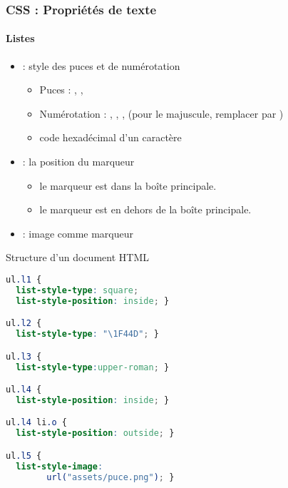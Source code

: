 \documentclass[xcolor=table]{beamer}
\begin{document}
\begin{frame}[fragile]
\frametitle{CSS : Propriétés de texte}
\framesubtitle{Listes}

\begin{minipage}{0.60\textwidth}
	\begin{itemize}
		\item {} : style des puces et de numérotation
		\begin{itemize}
			\item Puces : , , 
			\item Numérotation : , , ,  (pour le majuscule, remplacer  par )
			\item code hexadécimal d'un caractère
		\end{itemize}
		\item {} : la position du marqueur 
		\begin{itemize}
			\item {} le marqueur est dans la boîte principale.
			\item {} le marqueur est en dehors de la boîte principale.
		\end{itemize}
		\item {} : image comme marqueur 
	\end{itemize}
\end{minipage}
%
\begin{minipage}{0.38\textwidth}
	\begin{exampleblock}{Structure d'un document HTML}
		\lstset{escapeinside=**}
\tiny\bfseries\vspace{-6pt}
\begin{lstlisting}[language={CSS}]
ul.l1 {
  list-style-type: square;
  list-style-position: inside; }

ul.l2 {
  list-style-type: "\1F44D"; }

ul.l3 {
  list-style-type:upper-roman; }

ul.l4 {
  list-style-position: inside; }

ul.l4 li.o {
  list-style-position: outside; }

ul.l5 {
  list-style-image: 
        url("assets/puce.png"); }
\end{lstlisting}\vspace{-6pt}
\end{exampleblock}
\end{minipage}
\end{frame}
\end{document}
